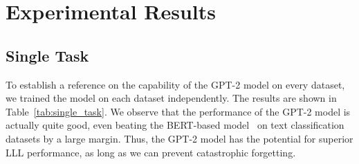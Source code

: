 \documentclass{article} \usepackage{iclr2020_conference,times}
\begin{document}
\section{Experimental Results}

\subsection{Single Task}
To establish a reference on the capability of the GPT-2 model on every dataset, we trained the model on each dataset independently.
The results are shown in Table~\ref{tab:single_task}.
We observe that the performance of the GPT-2 model is actually quite good, even beating the BERT-based model~\citep{d2019episodic} on text classification datasets by a large margin.
Thus, the GPT-2 model has the potential for superior LLL performance, as long as we can prevent catastrophic forgetting.
\end{document}
